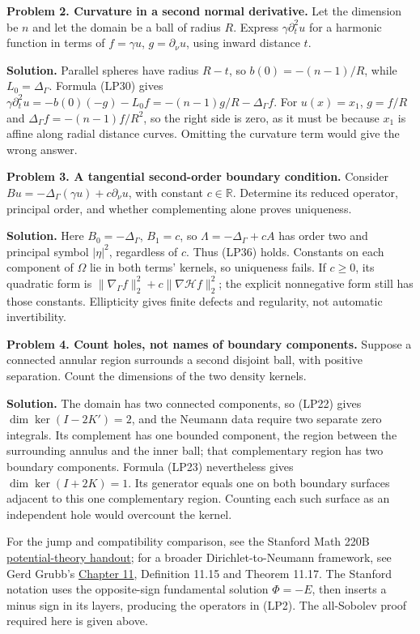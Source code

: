 \documentclass[
  11pt,
]{article}
\begin{document}
\textbf{Problem 2. Curvature in a second normal derivative.} Let the
dimension be \(n\) and let the domain be a ball of radius \(R\). Express
\(\gamma\partial_t^2u\) for a harmonic function in terms of
\(f=\gamma u\), \(g=\partial_\nu u\), using inward distance \(t\).

\textbf{Solution.} Parallel spheres have radius \(R-t\), so
\(b(0)=-(n-1)/R\), while \(L_0=\Delta_\Gamma\). Formula (LP30) gives
\(\gamma\partial_t^2u=-b(0)(-g)-L_0f=-(n-1)g/R-\Delta_\Gamma f\). For
\(u(x)=x_1\), \(g=f/R\) and \(\Delta_\Gamma f=-(n-1)f/R^2\), so the
right side is zero, as it must be because \(x_1\) is affine along radial
distance curves. Omitting the curvature term would give the wrong
answer.

\textbf{Problem 3. A tangential second-order boundary condition.}
Consider \(Bu=-\Delta_\Gamma(\gamma u)+c\partial_\nu u\), with constant
\(c\in\mathbb R\). Determine its reduced operator, principal order, and
whether complementing alone proves uniqueness.

\textbf{Solution.} Here \(B_0=-\Delta_\Gamma\), \(B_1=c\), so
\(\Lambda=-\Delta_\Gamma+cA\) has order two and principal symbol
\(|\eta|^2\), regardless of \(c\). Thus (LP36) holds. Constants on each
component of \(\Omega\) lie in both terms' kernels, so uniqueness fails.
If \(c\ge0\), its quadratic form is
\(\|\nabla_\Gamma f\|_2^2+c\|\nabla \mathcal H f\|_2^2\); the explicit
nonnegative form still has those constants. Ellipticity gives finite
defects and regularity, not automatic invertibility.

\textbf{Problem 4. Count holes, not names of boundary components.}
Suppose a connected annular region surrounds a second disjoint ball,
with positive separation. Count the dimensions of the two density
kernels.

\textbf{Solution.} The domain has two connected components, so (LP22)
gives \(\dim\ker(I-2K')=2\), and the Neumann data require two separate
zero integrals. Its complement has one bounded component, the region
between the surrounding annulus and the inner ball; that complementary
region has two boundary components. Formula (LP23) nevertheless gives
\(\dim\ker(I+2K)=1\). Its generator equals one on both boundary surfaces
adjacent to this one complementary region. Counting each such surface as
an independent hole would overcount the kernel.

For the jump and compatibility comparison, see the Stanford Math 220B
\href{https://web.stanford.edu/class/math220b/handouts/potential.pdf}{potential-theory
handout}; for a broader Dirichlet-to-Neumann framework, see Gerd Grubb's
\href{https://web.math.ku.dk/~grubb/dist11n.pdf}{Chapter 11}, Definition
11.15 and Theorem 11.17. The Stanford notation uses the opposite-sign
fundamental solution \(\Phi=-E\), then inserts a minus sign in its
layers, producing the operators in (LP2). The all-Sobolev proof required
here is given above.
\end{document}
